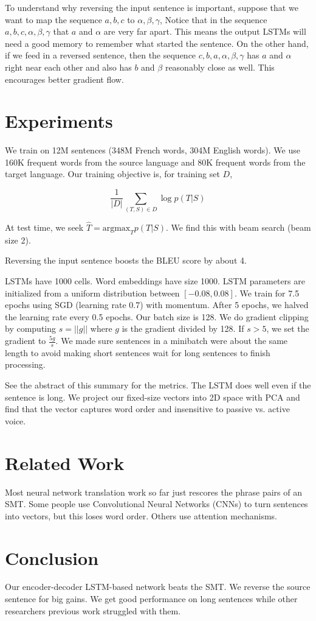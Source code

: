 \documentclass[a4paper]{article}
\begin{document}
To understand why reversing the input sentence is important, suppose that
we want to map the sequence $a, b, c$ to $\alpha, \beta, \gamma$, Notice that
in the sequence $a, b, c, \alpha, \beta, \gamma$ that $a$ and $\alpha$ are
very far apart. This means the output LSTMs will need a good memory to remember
what started the sentence. On the other hand, if we feed in a reversed
sentence, then the sequence $c, b, a, \alpha, \beta, \gamma$ has $a$ and
$\alpha$ right near each other and also has $b$ and $\beta$ reasonably
close as well. This encourages better gradient flow.

\section{Experiments}
We train on 12M sentences (348M French words, 304M English words). We use
160K frequent words from the source language and 80K frequent words from
the target language. Our training objective is, for training set $D$,

$$
\frac{1}{|D|} \sum_{(T, S) \in D}{\log{p(T|S)}}
$$

At test time, we seek $\hat{T} = \textrm{argmax}_{T}{p(T|S)}$. We find this
with beam search (beam size 2).

Reversing the input sentence boosts the BLEU score by about 4.

LSTMs have 1000 cells. Word embeddings have size 1000. LSTM parameters are
initialized from a uniform distribution between $[-0.08, 0.08]$. We train
for 7.5 epochs using SGD (learning rate 0.7) with momentum. After 5 epochs,
we halved the learning rate every 0.5 epochs. Our batch size is 128. We do
gradient clipping by computing $s = ||g||$ where $g$ is the gradient
divided by 128. If $s > 5$, we set the gradient to $\frac{5g}{s}$. We made
sure sentences in a minibatch were about the same length to avoid making
short sentences wait for long sentences to finish processing.

See the abstract of this summary for the metrics. The LSTM does well even
if the sentence is long. We project our fixed-size vectors into 2D space
with PCA and find that the vector captures word order and insensitive to
passive vs. active voice.

\section{Related Work}
Most neural network translation work so far just rescores the phrase pairs of
an SMT. Some people use Convolutional Neural Networks (CNNs) to turn sentences
into vectors, but this loses word order. Others use attention mechanisms.

\section{Conclusion}
Our encoder-decoder LSTM-based network beats the SMT. We reverse the
source sentence for big gains. We get good performance on long sentences while
other researchers previous work struggled with them.
\end{document}
